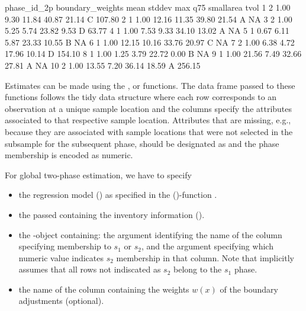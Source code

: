 \begin{small}
\begin{Schunk}
\begin{Soutput}
   phase_id_2p boundary_weights  mean stddev   max   q75 smallarea   tvol
1            2             1.00  9.30  11.84 40.87 21.14         C 107.80
2            1             1.00 12.16  11.35 39.80 21.54         A     NA
3            2             1.00  5.25   5.74 23.82  9.53         D  63.77
4            1             1.00  7.53   9.33 34.10 13.02         A     NA
5            1             0.67  6.11   5.87 23.33 10.55         B     NA
6            1             1.00 12.15  10.16 33.76 20.97         C     NA
7            2             1.00  6.38   4.72 17.96 10.14         D 154.10
8            1             1.00  1.25   3.79 22.72  0.00         B     NA
9            1             1.00 21.56   7.49 32.66 27.81         A     NA
10           2             1.00 13.55   7.20 36.14 18.59         A 256.15
\end{Soutput}
\end{Schunk}
\end{small}

Estimates can be made using the ,  or  functions. The data frame passed to these functions follows the tidy data structure \citep{wickham2014} where each row corresponds to an observation at a unique sample location and the columns specify the attributes associated to that respective sample location. Attributes that are missing, e.g., because they are associated with sample locations that were not selected in the subsample for the subsequent phase, should be designated as  and the phase membership is encoded as numeric.

For global two-phase estimation, we have to specify

\begin{itemize}
  \itemsep0em
  \item the regression model () as specified in the ()-function \citep{R}.
  \item the passed  containing the inventory information ().
  \item the -object  containing: the  argument identifying the name of the column specifying membership to $s_1$ or $s_2$, and the  argument specifying which numeric value indicates $s_2$ membership in that column. Note that  implicitly assumes that all rows not indiscated as $s_2$ belong to the $s_1$ phase.
  \item the name of the column containing the weights $w(x)$ of the boundary adjustments (optional).
\end{itemize}

